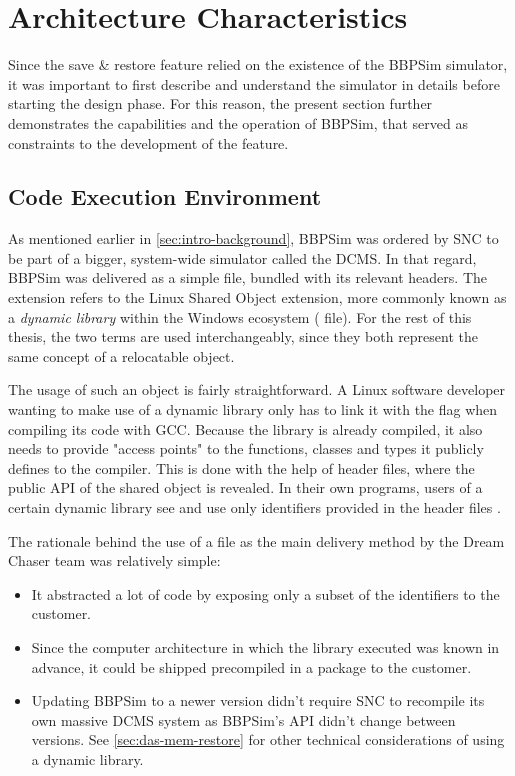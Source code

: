 {\section{Architecture Characteristics}\label{sec:bbpsim-charact}
Since the save \& restore feature relied on the existence of the \gls{BBPSim} simulator, it was important to first describe and understand the simulator in details before starting the design phase. For this reason, the present section further demonstrates the capabilities and the operation of \gls{BBPSim}, that served as constraints to the development of the feature.

\subsection*{Code Execution Environment}
As mentioned earlier in \autoref{sec:intro-background}, \gls{BBPSim} was ordered by \gls{SNC} to be part of a bigger, system-wide simulator called the \gls{DCMS}. In that regard, \gls{BBPSim} was delivered as a simple  file, bundled with its relevant headers. The  extension refers to the Linux Shared Object extension, more commonly known as a \textit{dynamic library} within the Windows ecosystem ( file). For the rest of this thesis, the two terms are used interchangeably, since they both represent the same concept of a relocatable object.

The usage of such an object is fairly straightforward. A Linux software developer wanting to make use of a dynamic library only has to link it with the  flag when compiling its code with GCC. Because the library is already compiled, it also needs to provide "access points" to the functions, classes and types it publicly defines to the compiler. This is done with the help of header files, where the public API of the shared object is revealed. In their own programs, users of a certain dynamic library see and use only identifiers provided in the header files .

The rationale behind the use of a  file as the main delivery method by the Dream Chaser team was relatively simple:
\begin{itemize}
	\item It abstracted a lot of code by exposing only a subset of the identifiers to the customer.
	\item Since the computer architecture in which the library executed was known in advance, it could be shipped precompiled in a package to the customer.
	\item Updating \gls{BBPSim} to a newer version didn't require \gls{SNC} to recompile its own massive \gls{DCMS} system as \gls{BBPSim}'s API didn't change between versions. See \autoref{sec:das-mem-restore} for other  technical considerations of using a dynamic library.
\end{itemize}

}
